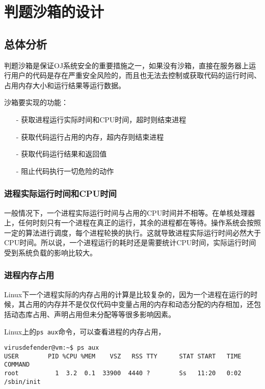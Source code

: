 \section{判题沙箱的设计}
\subsection{总体分析}
判题沙箱是保证OJ系统安全的重要措施之一，如果没有沙箱，直接在服务器上运行用户的代码是存在严重安全风险\cite{wooyun-oj-vul}的，而且也无法去控制或获取代码的运行时间、占用内存大小和运行结果等运行数据。

沙箱要实现的功能：

\begin{itemize}
\item[-]获取进程运行实际时间和CPU时间，超时则结束进程
\item[-]获取代码运行占用的内存，超内存则结束进程
\item[-]获取代码运行结果和返回值
\item[-]阻止代码执行一切危险的动作
\end{itemize}

\subsubsection{进程实际运行时间和CPU时间}

一般情况下，一个进程实际运行时间与占用的CPU时间并不相等。在单核处理器上，任何时刻只有一个进程在真正的运行，其余的进程都在等待。操作系统会按照一定的算法进行调度，每个进程轮换的执行。这就导致进程实际运行时间必然大于CPU时间。所以说，一个进程运行的耗时还是需要统计CPU时间，实际运行时间受到系统负载的影响比较大。

\subsubsection{进程内存占用}

Linux下一个进程实际的内存占用的计算是比较复杂的，因为一个进程在运行的时候，其占用的内存并不是仅仅代码中变量占用的内存和动态分配的内存相加，还包括动态库占用、声明占用但未分配等等很多影响因素。

Linux上的\texttt{ps aux}命令，可以查看进程的内存占用，

\begin{verbatim}
virusdefender@vm:~$ ps aux
USER        PID %CPU %MEM    VSZ   RSS TTY      STAT START   TIME COMMAND
root          1  3.2  0.1  33900  4440 ?        Ss   11:20   0:02 /sbin/init
\end{verbatim}

